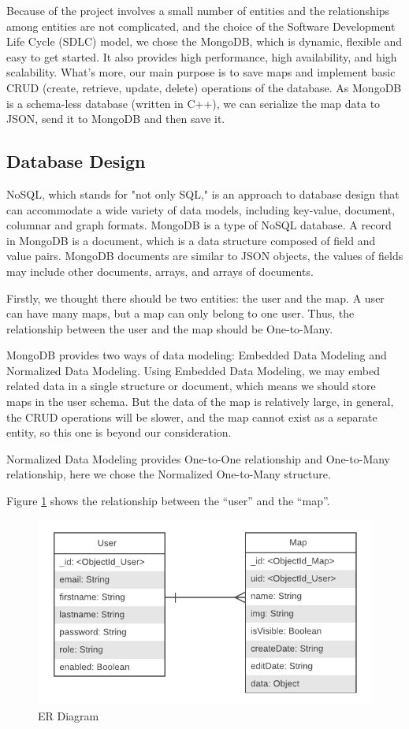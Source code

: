 Because of the project involves a small number of entities and the relationships among entities are not complicated, and the choice of the Software Development Life Cycle (SDLC) model, we chose the MongoDB, which is dynamic, flexible and easy to get started. It also provides high performance, high availability, and high scalability. What's more, our main purpose is to save maps and implement basic CRUD (create, retrieve, update, delete) operations of the database. As MongoDB is a schema-less database (written in C++), we can serialize the map data to JSON, send it to MongoDB and then save it.

\subsection{Database Design}
NoSQL, which stands for "not only SQL," is an approach to database design that can accommodate a wide variety of data models, including key-value, document, columnar and graph formats. MongoDB is a type of NoSQL database. A record in MongoDB is a document, which is a data structure composed of field and value pairs. MongoDB documents are similar to JSON objects, the values of fields may include other documents, arrays, and arrays of documents.

Firstly, we thought there should be two entities: the user and the map. A user can have many maps, but a map can only belong to one user. Thus, the relationship between the user and the map should be One-to-Many.

MongoDB provides two ways of data modeling: Embedded Data Modeling and Normalized Data Modeling. Using Embedded Data Modeling, we may embed related data in a single structure or document, which means we should store maps in the user schema. But the data of the map is relatively large, in general, the CRUD operations will be slower, and the map cannot exist as a separate entity, so this one is beyond our consideration.

Normalized Data Modeling provides One-to-One relationship and One-to-Many relationship,
here we chose the Normalized One-to-Many structure.

Figure \ref{ER Diagram} shows the relationship between the ``user'' and the ``map''.

\begin{figure}[htb]
\centering
\includegraphics[width=\textwidth]{section03/assets/ER_Diagram.png}
\caption[ER Diagram]{\label{ER Diagram}ER Diagram}
\end{figure}

